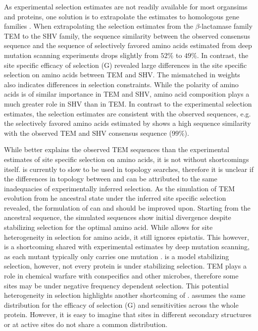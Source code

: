 As experimental selection estimates are not readily available for most organsims and proteins, one solution is to extrapolate the estimates to homologous gene families \citep{bloom2014, bloom2017}.
When extrapolating the selection estimates from the $\beta$-lactamase family TEM to the SHV family, the sequence similarity between the observed consensus sequence and the sequence of selectively favored amino acids estimated from deep mutation scanning experiments drops slightly from $52 \% $ to $49 \%$.
In contrast, the site specific efficacy of selection (G) revealed large differences in the site specific selection on amino acids between TEM and SHV.
The mismatched in \PC weights also indicates differences in selection constraints. 
While the polarity of amino acids is of similar importance in TEM and SHV, amino acid composition plays a much greater role in SHV than in TEM.
In contrast to the experimental selection estimates, the \selac selection estimates are consistent with the observed sequences, e.g. the selectively favored amino acids estimated by \selac shows a high sequence similarity with the observed TEM and SHV consensus sequence ($99 \%$).

While \selac better explains the observed TEM sequences than the experimental estimates of site specific selection on amino acids, it is not without shortcomings itself.
\selac is currently to slow to be used in topology searches, therefore it is unclear if the differences in topology between \phydms and \selac can be attributed to the same inadequacies of experimentally inferred selection.
As the simulation of TEM evolution from he ancestral state under the \selac inferred site specific selection revealed, the formulation of \selac can and should be improved upon.
Starting from the ancestral sequence, the simulated sequences show initial divergence despite stabilizing selection for the optimal amino acid.
While \selac allows for site heterogeneity in selection for amino acids, it still ignores epistatis.
This however, is a shortcoming shared with experimental estimates by deep mutation scanning, as each mutant typically only carries one mutation \citep{FirnbergAndOstermeier2012, Jain2014}.
\selac is a model stabilizing selection, however, not every protein is under stabilizing selection.
TEM plays a role in chemical warfare with conspecifics and other microbes, therefore some sites may be under negative frequency dependent selection.
This potential heterogeneity in selection highlights another shortcoming of \selac.
\selac assumes the same distribution for the efficacy of selection (G) and \PC sensitivities across the whole protein.
However, it is easy to imagine that sites in different secondary structures or at active sites do not share a common distribution.

